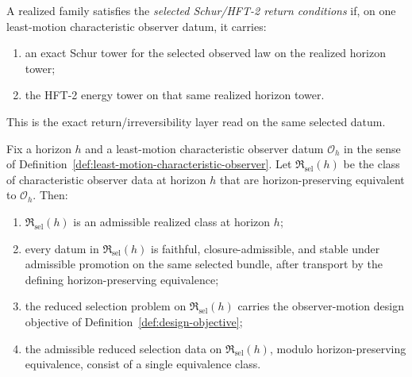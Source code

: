 \begin{definition}
\label{def:selected-schur-hft2-return-package}
A realized family satisfies the \emph{selected Schur/HFT-2 return conditions} if,
on one least-motion characteristic observer datum, it carries:
\begin{enumerate}[label=(\roman*), leftmargin=2em, itemsep=0.2em]
\item an exact Schur tower for the selected observed law on the realized
      horizon tower;
\item the HFT-2 energy tower on that same realized horizon tower.
\end{enumerate}
This is the exact return/irreversibility layer read on the same selected datum.
\end{definition}

\begin{theorem}
\label{thm:least-motion-observer-equivalence-class-is-admissible-selected-class}
Fix a horizon \(h\) and a least-motion characteristic observer datum
\(\mathcal O_h\) in the sense of
Definition~\ref{def:least-motion-characteristic-observer}. Let
\(\mathfrak R_{\mathrm{sel}}(h)\) be the class of characteristic observer data
at horizon \(h\) that are horizon-preserving equivalent to \(\mathcal O_h\).
Then:
\begin{enumerate}[label=(\roman*), leftmargin=2em, itemsep=0.2em]
\item \(\mathfrak R_{\mathrm{sel}}(h)\) is an admissible realized class at
      horizon \(h\);
\item every datum in \(\mathfrak R_{\mathrm{sel}}(h)\) is faithful,
      closure-admissible, and stable under admissible promotion on the same
      selected bundle, after transport by the defining horizon-preserving
      equivalence;
\item the reduced selection problem on \(\mathfrak R_{\mathrm{sel}}(h)\)
      carries the observer-motion design objective of
      Definition~\ref{def:design-objective};
\item the admissible reduced selection data on
      \(\mathfrak R_{\mathrm{sel}}(h)\), modulo horizon-preserving
      equivalence, consist of a single equivalence class.
\end{enumerate}
\end{theorem}


